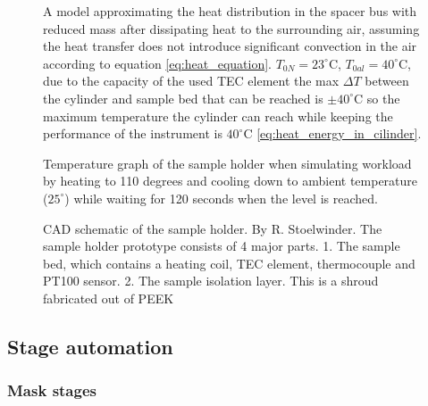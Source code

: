\documentclass[10pt]{article}
\begin{document}
\begin{figure}[H]
\begin{minipage}[b]{0.45\textwidth}
    \caption{A model approximating the heat distribution in the spacer bus with reduced mass after dissipating heat to the surrounding air, assuming the heat transfer does not introduce significant convection in the air according to equation \ref{eq:heat_equation}. $T_{0N} = 23^\circ$C, $T_{0al} = 40^\circ$C, due to the capacity of the used TEC element the max $\Delta T$ between the cylinder and sample bed that can be reached is $\pm 40^\circ$C so the maximum temperature the cylinder can reach while keeping the performance of the instrument is $40^\circ$C \ref{eq:heat_energy_in_cilinder}.}
  \end{minipage}
\end{figure}


\begin{figure}[H]
  \centering
  \begin{minipage}[b]{0.45\textwidth}
    \caption{Temperature graph of the sample holder when simulating workload by heating to 110 degrees and cooling down to ambient temperature ($25^\circ$) while waiting for 120 seconds when the level is reached.}
    \label{fig:temperature_graph}
  \end{minipage}
  \hfill
  \begin{minipage}[b]{0.45\textwidth}
    \caption{CAD schematic of the sample holder. By R. Stoelwinder. The sample holder prototype consists of 4 major parts. 1. The sample bed, which contains a heating coil, TEC element, thermocouple and PT100 sensor. 2. The sample isolation layer. This is a shroud fabricated out of PEEK}
    \label{fig:CAD_sample_holder}
  \end{minipage}
\end{figure}

\subsection{Stage automation}

\subsubsection{Mask stages}
\end{document}

